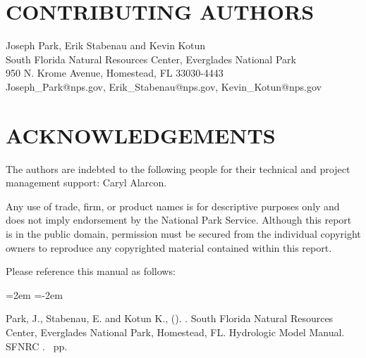 \section*{CONTRIBUTING AUTHORS}
\normalsize

Joseph Park, Erik Stabenau and Kevin Kotun\\
South Florida Natural Resources Center, Everglades National Park\\
950 N. Krome Avenue, Homestead, FL 33030-4443\\[0.1in]

{} Joseph\_Park@nps.gov, Erik\_Stabenau@nps.gov, Kevin\_Kotun@nps.gov

\section*{ACKNOWLEDGEMENTS}

The authors are indebted to the following people for their technical and project management support:
Caryl Alarcon.
\\[0.1in]

\vfill


\noindent Any use of trade, firm, or product names is for descriptive purposes only and does not imply endorsement by the National Park Service. Although this report is in the public domain, permission must be secured from the individual copyright owners to reproduce any copyrighted material contained within this report.
\\[0.1in]

\begingroup

\noindent Please reference this manual as follows:

\leftskip=2em
\parindent=-2em

Park, J., Stabenau, E. and Kotun K., (\pubyear). \titleinfo. South Florida Natural Resources Center, Everglades National Park, Homestead, FL. Hydrologic Model Manual. SFNRC \reportnumber. \pageref{LastPage}~pp.

\endgroup

\rmfamily
\large
\cleardoublepage

